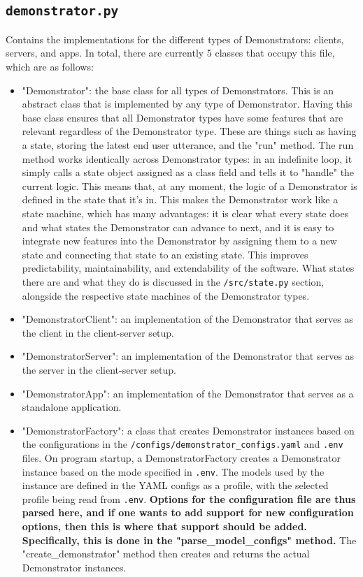 \subsection{\texttt{demonstrator.py}}
Contains the implementations for the different types of Demonstrators: clients, servers, and apps.
In total, there are currently 5 classes that occupy this file, which are as follows:
\begin{itemize}
    \item "Demonstrator": the base class for all types of Demonstrators.
    This is an abstract class that is implemented by any type of Demonstrator.
    Having this base class ensures that all Demonstrator types have some features that are relevant regardless of the Demonstrator type.
    These are things such as having a state, storing the latest end user utterance, and the "run" method.
    The run method works identically across Demonstrator types: in an indefinite loop, it simply calls a state object assigned as a class field and tells it to "handle" the current logic.
    This means that, at any moment, the logic of a Demonstrator is defined in the state that it's in.
    This makes the Demonstrator work like a state machine, which has many advantages: it is clear what every state does and what states the Demonstrator can advance to next, and it is easy to integrate new features into the Demonstrator by assigning them to a new state and connecting that state to an existing state.
    This improves predictability, maintainability, and extendability of the software.
    What states there are and what they do is discussed in the \texttt{/src/state.py} section, alongside the respective state machines of the Demonstrator types.
    \item "DemonstratorClient": an implementation of the Demonstrator that serves as the client in the client-server setup.
    \item "DemonstratorServer": an implementation of the Demonstrator that serves as the server in the client-server setup.
    \item "DemonstratorApp": an implementation of the Demonstrator that serves as a standalone application.
    \item "DemonstratorFactory": a class that creates Demonstrator instances based on the configurations in the \texttt{/configs/demonstrator\_configs.yaml} and \texttt{.env} files.
    On program startup, a DemonstratorFactory creates a Demonstrator instance based on the mode specified in \texttt{.env}.
    The models used by the instance are defined in the YAML configs as a profile, with the selected profile being read from \texttt{.env}.
    \textbf{Options for the configuration file are thus parsed here, and if one wants to add support for new configuration options, then this is where that support should be added. 
    Specifically, this is done in the "parse\_model\_configs" method.}
    The "create\_demonstrator" method then creates and returns the actual Demonstrator instances.
\end{itemize}

